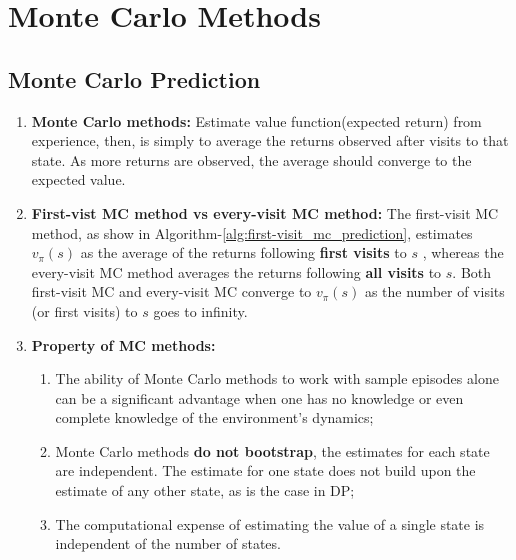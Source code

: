 
\chapter{Monte Carlo Methods}
\label{chap:ch_5_Monte_Carlo_Methods}
\section{Monte Carlo Prediction}
\begin{enumerate}
	\item \textbf{Monte Carlo methods:} Estimate value function(expected return) from experience, then, is simply to average the returns observed after visits to that state. As more returns are observed, the average should converge to the expected value.

	\item \textbf{First-vist MC method vs every-visit MC method:}  The first-visit MC method, as show in Algorithm-\ref{alg:first-visit_mc_prediction}, estimates $v_{\pi}(s)$ as the average of the returns following \textbf{first visits} to $s$ , whereas the every-visit MC method averages the returns following \textbf{all visits} to $s$. Both first-visit MC and every-visit MC converge to $v_{\pi}(s)$ as the number of visits (or first visits) to $s$ goes to infinity.

	\item \textbf{Property of MC methods:} 
	\begin{enumerate}
	\item The ability of Monte Carlo methods to work with sample episodes alone can be a significant advantage when one has no knowledge or even complete knowledge of the environment’s dynamics;

	\item Monte Carlo methods \textbf{do not bootstrap}, the estimates for each state are independent. The estimate for one state does not build upon the estimate of any other state, as is the case in DP;

	\item The computational expense of estimating the value of a single state is independent of the number of states. 
	\end{enumerate}
\end{enumerate}

